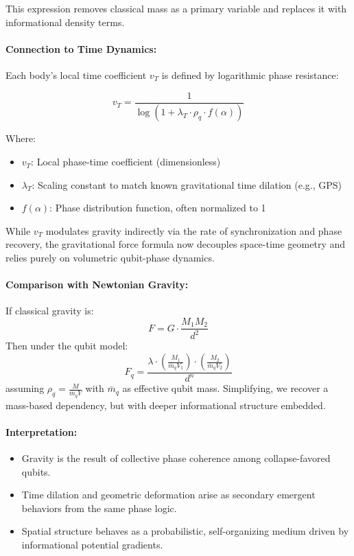 \documentclass[12pt]{report} %
\begin{document}
This expression removes classical mass as a primary variable and replaces it with informational density terms.

\paragraph{Connection to Time Dynamics:}
Each body's local time coefficient \(v_T\) is defined by logarithmic phase resistance:

\[
v_T = \frac{1}{\log\left(1 + \lambda_T \cdot \rho_q \cdot f(\alpha)\right)}
\]

Where:
\begin{itemize}
  \item \( v_T \): Local phase-time coefficient (dimensionless)
  \item \( \lambda_T \): Scaling constant to match known gravitational time dilation (e.g., GPS)
  \item \( f(\alpha) \): Phase distribution function, often normalized to 1
\end{itemize}

While \(v_T\) modulates gravity indirectly via the rate of synchronization and phase recovery, the gravitational force formula now decouples space-time geometry and relies purely on volumetric qubit-phase dynamics.

\paragraph{Comparison with Newtonian Gravity:}
If classical gravity is:
\[
F = G \cdot \frac{M_1 M_2}{d^2}
\]
Then under the qubit model:
\[
F_q = \frac{\lambda \cdot \left( \frac{M_1}{\bar{m}_q V_1} \right) \cdot \left( \frac{M_2}{\bar{m}_q V_2} \right)}{d^n}
\]
assuming \( \rho_q = \frac{M}{\bar{m}_q V} \) with \( \bar{m}_q \) as effective qubit mass. Simplifying, we recover a mass-based dependency, but with deeper informational structure embedded.

\paragraph{Interpretation:}
\begin{itemize}
  \item Gravity is the result of collective phase coherence among collapse-favored qubits.
  \item Time dilation and geometric deformation arise as secondary emergent behaviors from the same phase logic.
  \item Spatial structure behaves as a probabilistic, self-organizing medium driven by informational potential gradients.
\end{itemize}
\end{document}

